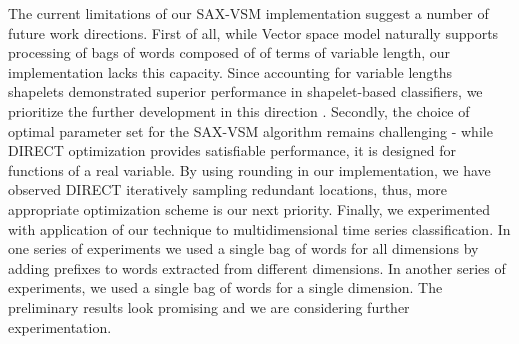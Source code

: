 \documentclass{llncs}
\begin{document}
The current limitations of our SAX-VSM implementation suggest a number of future work directions. 
First of all, while Vector space model naturally supports processing of bags of words composed of
of terms of variable length, our implementation lacks this capacity. Since accounting for variable 
lengths shapelets demonstrated superior performance \cite{bagnal} in shapelet-based classifiers,
we prioritize the further development in this direction
. Secondly, the choice of optimal parameter set for the SAX-VSM algorithm remains challenging - 
while DIRECT optimization provides satisfiable performance, it is designed for functions of a real 
variable. By using rounding in our implementation, we have observed DIRECT iteratively sampling 
redundant locations, thus, more appropriate optimization scheme is our next priority. 
Finally, we experimented with application of our technique to multidimensional time 
series classification. 
In one series of experiments we used a single bag of words for all dimensions by adding 
prefixes to words extracted from different dimensions. 
In another series of experiments, we used a single bag of words for a single dimension. 
The preliminary results look promising and we are considering further experimentation.
\end{document}
